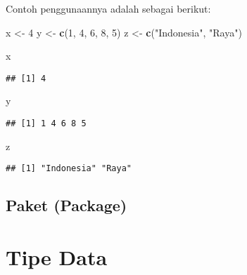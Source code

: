 \documentclass[
]{book}
\newenvironment{Shaded}{\begin{snugshade}}{\end{snugshade}}
\newcommand{\DecValTok}[1]{\textcolor[rgb]{0.00,0.00,0.81}{#1}}
\newcommand{\KeywordTok}[1]{\textcolor[rgb]{0.13,0.29,0.53}{\textbf{#1}}}
\newcommand{\NormalTok}[1]{#1}
\newcommand{\StringTok}[1]{\textcolor[rgb]{0.31,0.60,0.02}{#1}}
\begin{document}
Contoh penggunaannya adalah sebagai berikut:

\begin{Shaded}
\begin{Highlighting}[]
\NormalTok{x <-}\StringTok{ }\DecValTok{4}
\NormalTok{y <-}\StringTok{ }\KeywordTok{c}\NormalTok{(}\DecValTok{1}\NormalTok{, }\DecValTok{4}\NormalTok{, }\DecValTok{6}\NormalTok{, }\DecValTok{8}\NormalTok{, }\DecValTok{5}\NormalTok{)}
\NormalTok{z <-}\StringTok{ }\KeywordTok{c}\NormalTok{(}\StringTok{"Indonesia"}\NormalTok{, }\StringTok{"Raya"}\NormalTok{)}
\end{Highlighting}
\end{Shaded}

\begin{Shaded}
\begin{Highlighting}[]
\NormalTok{x}
\end{Highlighting}
\end{Shaded}

\begin{verbatim}
## [1] 4
\end{verbatim}

\begin{Shaded}
\begin{Highlighting}[]
\NormalTok{y}
\end{Highlighting}
\end{Shaded}

\begin{verbatim}
## [1] 1 4 6 8 5
\end{verbatim}

\begin{Shaded}
\begin{Highlighting}[]
\NormalTok{z}
\end{Highlighting}
\end{Shaded}

\begin{verbatim}
## [1] "Indonesia" "Raya"
\end{verbatim}

\hypertarget{paket-package}{%
\section{Paket (Package)}\label{paket-package}}

\hypertarget{datatype}{%
\chapter{Tipe Data}\label{datatype}}
\end{document}

